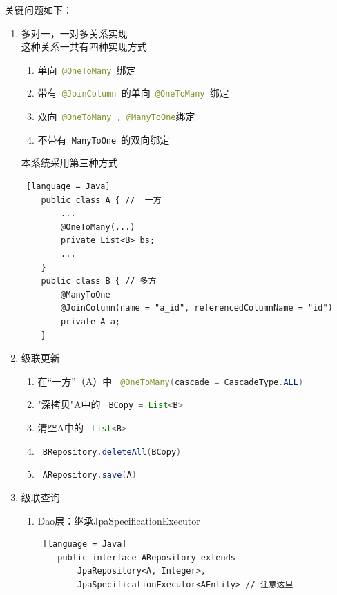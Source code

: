 关键问题如下：

\begin{enumerate}
    \item 多对一，一对多关系实现\\
          这种关系一共有四种实现方式
          \begin{enumerate}
              \item 单向\lstinline[language = Java]| @OneToMany |绑定
              \item 带有\lstinline[language = Java]| @JoinColumn |的单向\lstinline[language = Java]| @OneToMany |绑定
              \item 双向\lstinline[language = Java]| @OneToMany , @ManyToOne|绑定
              \item 不带有\lstinline[language = Java]| ManyToOne |的双向绑定
          \end{enumerate}
          本系统采用第三种方式
          \begin{lstlisting} [language = Java]
    public class A { //  一方
        ...
        @OneToMany(...)
        private List<B> bs;
        ...
    }
    public class B { // 多方
        @ManyToOne
        @JoinColumn(name = "a_id", referencedColumnName = "id")
        private A a;
    }
\end{lstlisting}
    \item 级联更新
          \begin{enumerate}
              \item 在“一方”（A）中 \lstinline[language = Java]| @OneToMany(cascade = CascadeType.ALL) |
              \item "深拷贝"A中的 \lstinline[language = Java]| BCopy = List<B> |
              \item 清空A中的 \lstinline[language = Java]| List<B> |
              \item \lstinline[language = Java]| BRepository.deleteAll(BCopy) |
              \item \lstinline[language = Java]| ARepository.save(A) |
          \end{enumerate}
    \item 级联查询
          \begin{enumerate}
              \item Dao层：继承JpaSpecificationExecutor
                    \begin{lstlisting} [language = Java]
    public interface ARepository extends 
        JpaRepository<A, Integer>, 
        JpaSpecificationExecutor<AEntity> // 注意这里
\end{lstlisting}

\end{enumerate}
\end{enumerate}
